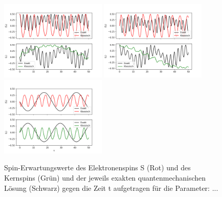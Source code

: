 \begin{figure}[h!]
    \centering
    \includegraphics[width = 0.45\textwidth]{Abbildungen/Plot_Sx.png}
    \includegraphics[width = 0.45\textwidth]{Abbildungen/Plot_Sy.png}
    \includegraphics[width = 0.45\textwidth]{Abbildungen/Plot_Sz.png}
    \caption{Spin-Erwartungswerte des Elektronenspins S (Rot) und des Kernspins (Grün) und der jeweils exakten quantenmechanischen Lösung
    (Schwarz) gegen die Zeit t aufgetragen für die Parameter: ...}
    \label{fig:Plots}
\end{figure}
